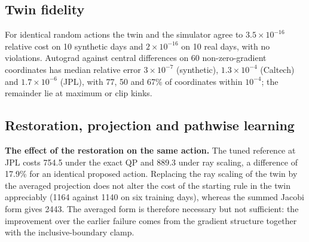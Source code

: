 \documentclass[11pt]{article}
\begin{document}
\subsection{Twin fidelity}\label{sec:res-twin}
For identical random actions the twin and the simulator agree to $3.5\times10^{-16}$ relative cost on 10 synthetic days and $2\times10^{-16}$ on 10 real days, with no violations. Autograd against central differences on 60 non-zero-gradient coordinates has median relative error $3\times10^{-7}$ (synthetic), $1.3\times10^{-4}$ (Caltech) and $1.7\times10^{-6}$ (JPL), with 77, 50 and 67\% of coordinates within $10^{-4}$; the remainder lie at maximum or clip kinks.

\subsection{Restoration, projection and pathwise learning}\label{sec:res-pgd}
\textbf{The effect of the restoration on the same action.} The tuned reference at JPL costs 754.5 under the exact QP and 889.3 under ray scaling, a difference of 17.9\% for an identical proposed action. Replacing the ray scaling of the twin by the averaged projection does not alter the cost of the starting rule in the twin appreciably (1164 against 1140 on six training days), whereas the summed Jacobi form gives 2443. The averaged form is therefore necessary but not sufficient: the improvement over the earlier failure comes from the gradient structure together with the inclusive-boundary clamp.
\end{document}
